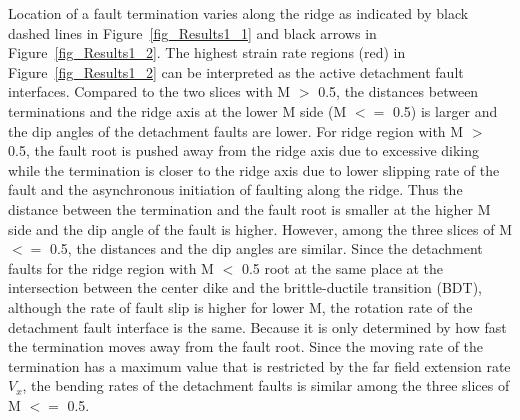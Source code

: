 Location of a fault termination varies along the ridge as indicated by black dashed lines in Figure~\hyperref[fig_Results1_1]{\ref{fig_Results1_1}} and black arrows in Figure~\hyperref[fig_Results1_2]{\ref{fig_Results1_2}}. The highest strain rate regions (red) in Figure~\hyperref[fig_Results1_2]{\ref{fig_Results1_2}} can be interpreted as the active detachment fault interfaces. Compared to the two slices with M $>$ 0.5, the distances between terminations and the ridge axis at the lower M side (M $<=$ 0.5) is larger and the dip angles of the detachment faults are lower. For ridge region with M $>$ 0.5, the fault root is pushed away from the ridge axis due to excessive diking while the termination is closer to the ridge axis due to lower slipping rate of the fault and the asynchronous initiation of faulting along the ridge. Thus the distance between the termination and the fault root is smaller at the higher M side and the dip angle of the fault is higher. However, among the three slices of M $<=$ 0.5, the distances and the dip angles are similar. Since the detachment faults for the ridge region with M $<$ 0.5 root at the same place at the intersection between the center dike and the brittle-ductile transition (BDT), although the rate of fault slip is higher for lower M, the rotation rate of the detachment fault interface is the same. Because it is only determined by how fast the termination moves away from the fault root. Since the moving rate of the termination has a maximum value that is restricted by the far field extension rate $V_{x}$, the bending rates of the detachment faults is similar among the three slices of M $<=$ 0.5.  %